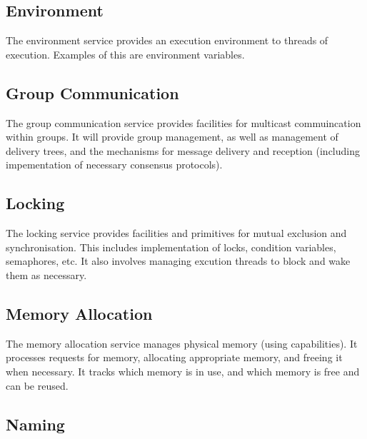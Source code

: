 \documentclass[a4paper,twoside]{report} %
\begin{document}
\subsection{Environment}


The environment service provides an execution environment to threads
of execution. Examples of this are environment variables.


\subsection{Group Communication}


The group communication service provides facilities for multicast
commuincation within groups.  It will provide group management, as
well as management of delivery trees, and the mechanisms for message
delivery and reception (including impementation of necessary consensus
protocols). 

\subsection{Locking}


The locking service provides facilities and primitives for mutual
exclusion and synchronisation.  This includes implementation of locks,
condition variables, semaphores, etc.  It also involves managing
excution threads to block and wake them as necessary.

\subsection{Memory Allocation}


The memory allocation service manages physical memory (using
capabilities).  It processes requests for memory, allocating appropriate
memory, and freeing it when necessary. It tracks which memory is in
use, and which memory is free and can be reused.


\subsection{Naming}
\end{document}
